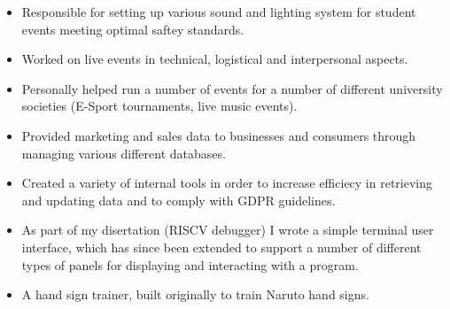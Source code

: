 \documentclass[10pt,a4paper,ragged2e,withhyper]{altacv}
\begin{document}
\divider

\begin{itemize}
	\item Responsible for setting up various sound and lighting system for student events meeting optimal saftey standards.
	\item Worked on live events in technical, logistical and interpersonal aspects.
	\item Personally helped run a number of events for a number of different university societies (E-Sport tournaments, live music events).
\end{itemize}

\divider

\begin{itemize}
	\item Provided marketing and sales data to businesses and consumers through managing various different databases.
	\item Created a variety of internal tools in order to increase efficiecy in retrieving and updating data and to comply with GDPR guidelines.
\end{itemize}



\begin{itemize}
	\item As part of my disertation (RISCV debugger) I wrote a simple terminal user interface, which has since been extended to support a number of different types of panels for displaying and interacting with a program.
\end{itemize}


\divider


\begin{itemize}
	\item A hand sign trainer, built originally to train Naruto hand signs.
\end{itemize}
\end{document}
